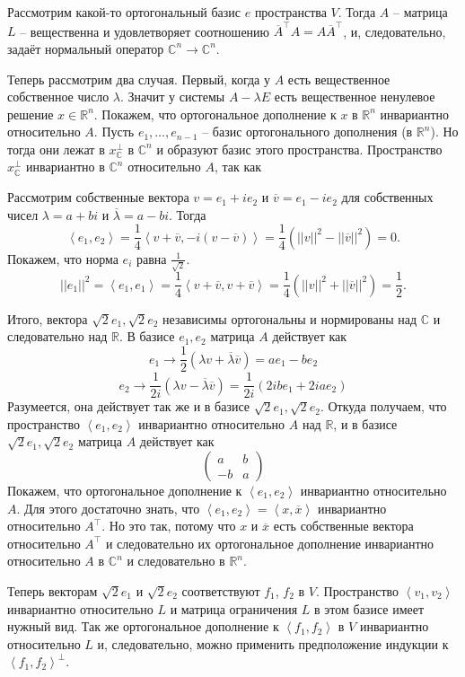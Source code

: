 \documentclass[10pt,a4paper,oneside]{book}
\theoremstyle{definition}
\newcommand{\mb}[1]{\mathbb{#1}}
\newcommand{\ovl}{\overline}
\def\lan{\left\langle }
\def\ran{\right\rangle}
\begin{document}
Рассмотрим какой-то ортогональный базис $e$ пространства $V$. Тогда $A$ -- матрица $L$ -- вещественна и удовлетворяет соотношению $\ovl{A}^{\top}A=A\ovl{A}^{\top}$, и, следовательно, задаёт нормальный оператор $\mb C^n \to \mb C^n$.

Теперь рассмотрим два случая. Первый, когда у $A$ есть вещественное собственное число $\lambda$. Значит у системы $A-\lambda E$ есть вещественное ненулевое решение $x\in \mb R^n$. Покажем, что ортогональное дополнение к $x$ в $\mb R^n$ инвариантно относительно $A$. Пусть $e_1,\dots,e_{n-1} $ -- базис ортогонального дополнения (в $\mb R^n$). Но тогда они лежат в $x^{\bot}_{\mb C}$ в $\mb C^n$ и образуют базис этого пространства. Пространство $x^{\bot}_{\mb C}$ инвариантно в $\mb C^n$ относительно $A$, так как  


Рассмотрим собственные вектора $v=e_1 + i e_2 $ и $\ovl{v}=e_1-ie_2$ для собственных чисел $\lambda= a+bi$ и $\ovl{\lambda}=a-bi$. Тогда
$$\lan e_1, e_2\ran = \frac{1}{4} \lan v+\ovl{v}, -i( v-\ovl{v})\ran= \frac{1}{4}(||v||^2-||\ovl{v}||^2)=0.$$
Покажем, что норма $e_i$ равна $\frac{1}{\sqrt{2}}$.
$$||e_1||^2=\lan e_1, e_1\ran = \frac{1}{4} \lan v+\ovl{v},  v+\ovl{v}\ran= \frac{1}{4}(||v||^2+||\ovl{v}||^2)=\frac{1}{2}.$$

Итого, вектора $\sqrt{2}e_1,\sqrt{2}e_2$ независимы ортогональны и нормированы над $\mb C$ и следовательно над $\mb R$. В базисе $e_1,e_2$ матрица $A$ действует как 
$$e_1 \to \frac{1}{2}(\lambda v + \ovl{\lambda}\ovl{v})=ae_1 - be_2 $$
$$e_2 \to \frac{1}{2i}(\lambda v - \ovl{\lambda}\ovl{v})=\frac{1}{2i}( 2i b e_1 + 2i  a e_2) $$
Разумеется, она действует так же и в базисе $\sqrt{2}e_1,\sqrt{2}e_2$. Откуда получаем, что пространство $\lan e_1,e_2\ran $ инвариантно относительно $A$ над $\mb R$, и в базисе $\sqrt{2}e_1,\sqrt{2}e_2$ матрица $A$  действует как  
$$\begin{pmatrix}
a & b\\
-b & a
\end{pmatrix}$$
Покажем, что ортогональное дополнение к $\lan e_1, e_2 \ran$ инвариантно относительно $A$. Для этого достаточно знать, что $\lan e_1, e_2\ran = \lan x, \ovl{x} \ran $ инвариантно относительно $A^{\top}$. Но это так, потому что $x$ и $\ovl{x}$ есть собственные вектора  относительно $A^{\top}$ и следовательно их ортогональное дополнение инвариантно относительно $A$ в $\mb C^n$ и следовательно в $\mb R^n$.

Теперь векторам $\sqrt{2}e_1$ и $\sqrt{2}e_2$ соответствуют $f_1$, $f_2$ в $V$. Пространство $\lan v_1,v_2 \ran$ инвариантно относительно $L$ и матрица ограничения $L$ в этом базисе имеет нужный вид. Так же ортогональное дополнение к $\lan f_1,f_2\ran$ в $V$ инвариантно относительно $L$ и, следовательно, можно применить предположение индукции к $\lan f_1,f_2\ran^{\bot}$. 
\endproof
\end{document}
